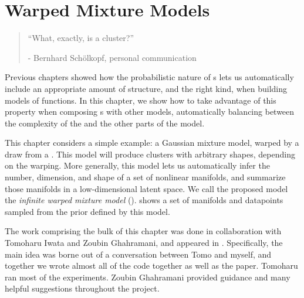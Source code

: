
\inbpdocument

\chapter{Warped Mixture Models}  %
\label{ch:warped}

\begin{quotation}
``What, exactly, is a cluster?''

\hspace*{\fill} - Bernhard Sch\"{o}lkopf, personal communication
\end{quotation}

Previous chapters showed how the probabilistic nature of \gp{}s lets us automatically include an appropriate amount of structure, and the right kind, when building models of functions.
In this chapter, we show how to take advantage of this property when composing \gp{}s with other models,
automatically balancing between the complexity of the \gp{} and the other parts of the model.

This chapter considers a simple example: a Gaussian mixture model, warped by a draw from a \gp{}.
This model will produce clusters with arbitrary shapes, depending on the warping.
More generally, this model lets us automatically infer the number, dimension, and shape of a set of nonlinear manifolds, and summarize those manifolds in a low-dimensional latent space.
We call the proposed model the {\it infinite warped mixture model} (\iwmm{}).
 shows a set of manifolds and datapoints sampled from the prior defined by this model.






The work comprising the bulk of this chapter was done in collaboration with Tomoharu Iwata and Zoubin Ghahramani, and appeared in \citet{IwaDuvGha12}.
Specifically, the main idea was borne out of a conversation between Tomo and myself, and together we wrote almost all of the code together as well as the paper.
Tomoharu ran most of the experiments.
Zoubin Ghahramani provided guidance and many helpful suggestions throughout the project.


